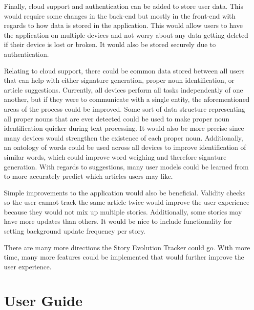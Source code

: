\documentclass[11pt,titlepage]{report}
\begin{document}
Finally, cloud support and authentication can be added to store user data. This would require some changes in the back-end but mostly in the front-end with regards to how data is stored in the application. This would allow users to have the application on multiple devices and not worry about any data getting deleted if their device is lost or broken. It would also be stored securely due to authentication. 

Relating to cloud support, there could be common data stored between all users that can help with either signature generation, proper noun identification, or article suggestions. Currently, all devices perform all tasks independently of one another, but if they were to communicate with a single entity, the aforementioned areas of the process could be improved. Some sort of data structure representing all proper nouns that are ever detected could be used to make proper noun identification quicker during text processing. It would also be more precise since many devices would strengthen the existence of each proper noun. Additionally, an ontology of words could be used across all devices to improve identification of similar words, which could improve word weighing and therefore signature generation. With regards to suggestions, many user models could be learned from to more accurately predict which articles users may like.

Simple improvements to the application would also be beneficial. Validity checks so the user cannot track the same article twice would improve the user experience because they would not mix up multiple stories. Additionally, some stories may have more updates than others. It would be nice to include functionality for setting background update frequency per story.

There are many more directions the Story Evolution Tracker could go. With more time, many more features could be implemented that would further improve the user experience.




\appendix
\chapter{User Guide}\label{appendix:userGuide}
\end{document}
